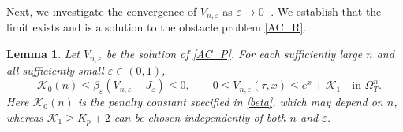 \documentclass[11pt, a4paper, leqno]{amsart}
\numberwithin{equation}{section}
\theoremstyle{plain}
\newtheorem{lemma}[theorem]{Lemma}
\theoremstyle{definition}
\theoremstyle{remark}
\def\leq{\leqslant}
\def\geq{\geqslant}
\begin{document}
Next, we investigate the convergence of $V_{n,\varepsilon}$ as
$\varepsilon \to 0^+$.
We establish that the limit exists and is a solution to the obstacle
problem \eqref{AC_R}.


\begin{lemma}\label{UBL}
{
Let $V_{n,\varepsilon}$ be the solution of \eqref{AC_P}.
For each sufficiently large $n$ and all sufficiently small
$\varepsilon\in(0,1)$,
\[
 -\mathcal K_0(n)\leq
 \beta_\varepsilon(V_{n,\varepsilon}-J_\varepsilon)\leq0,
 \qquad
 0\leq V_{n,\varepsilon}(\tau,x)\leq e^x+\mathcal K_1
 \quad\text{in }\Omega_T^n.
\]
Here $\mathcal K_0(n)$ is the penalty constant specified in \eqref{beta},
which may depend on $n$, whereas $\mathcal K_1\geq K_p+2$ can be chosen
independently of both $n$ and $\varepsilon$.
}
\end{lemma}
\end{document}
